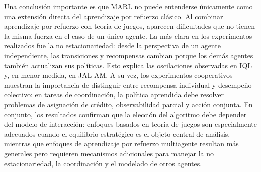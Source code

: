 \documentclass[letterpaper,12pt]{article} %
\begin{document}
Una conclusión importante es que MARL no puede entenderse únicamente como una extensión directa del aprendizaje por refuerzo clásico. Al combinar aprendizaje por refuerzo con teoría de juegos, aparecen dificultades que no tienen la misma fuerza en el caso de un único agente. La más clara en los experimentos realizados fue la no estacionariedad: desde la perspectiva de un agente independiente, las transiciones y recompensas cambian porque los demás agentes también actualizan sus políticas. Esto explica las oscilaciones observadas en IQL y, en menor medida, en JAL-AM. A su vez, los experimentos cooperativos muestran la importancia de distinguir entre recompensa individual y desempeño colectivo: en tareas de coordinación, la política aprendida debe resolver problemas de asignación de crédito, observabilidad parcial y acción conjunta. En conjunto, los resultados confirman que la elección del algoritmo debe depender del modelo de interacción: enfoques basados en teoría de juegos son especialmente adecuados cuando el equilibrio estratégico es el objeto central de análisis, mientras que enfoques de aprendizaje por refuerzo multiagente resultan más generales pero requieren mecanismos adicionales para manejar la no estacionariedad, la coordinación y el modelado de otros agentes.

            \clearpage
            \nocite{*}
            
            



\centering\vspace*{\fill} 
\end{document}
